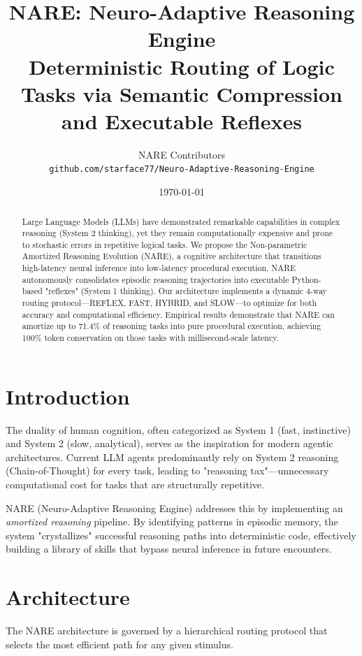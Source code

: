 \documentclass[11pt,a4paper]{article}
\title{NARE: Neuro-Adaptive Reasoning Engine \\ \large Deterministic Routing of Logic Tasks via Semantic Compression and Executable Reflexes}
\author{NARE Contributors \\ \texttt{github.com/starface77/Neuro-Adaptive-Reasoning-Engine}}
\date{\today}
\begin{document}
\maketitle

\begin{abstract}
Large Language Models (LLMs) have demonstrated remarkable capabilities in complex reasoning (System 2 thinking), yet they remain computationally expensive and prone to stochastic errors in repetitive logical tasks. We propose the Non-parametric Amortized Reasoning Evolution (NARE), a cognitive architecture that transitions high-latency neural inference into low-latency procedural execution. NARE autonomously consolidates episodic reasoning trajectories into executable Python-based "reflexes" (System 1 thinking). Our architecture implements a dynamic 4-way routing protocol—REFLEX, FAST, HYBRID, and SLOW—to optimize for both accuracy and computational efficiency. Empirical results demonstrate that NARE can amortize up to 71.4\% of reasoning tasks into pure procedural execution, achieving 100\% token conservation on those tasks with millisecond-scale latency.
\end{abstract}

\section{Introduction}
The duality of human cognition, often categorized as System 1 (fast, instinctive) and System 2 (slow, analytical), serves as the inspiration for modern agentic architectures. Current LLM agents predominantly rely on System 2 reasoning (Chain-of-Thought) for every task, leading to "reasoning tax"—unnecessary computational cost for tasks that are structurally repetitive.

NARE (Neuro-Adaptive Reasoning Engine) addresses this by implementing an \textit{amortized reasoning} pipeline. By identifying patterns in episodic memory, the system "crystallizes" successful reasoning paths into deterministic code, effectively building a library of skills that bypass neural inference in future encounters.

\section{Architecture}
The NARE architecture is governed by a hierarchical routing protocol that selects the most efficient path for any given stimulus.
\end{document}
